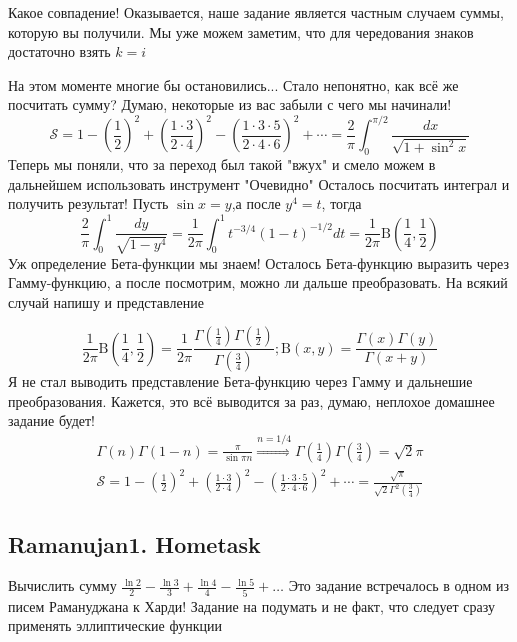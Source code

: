 	Какое совпадение! Оказывается, наше задание является частным случаем суммы, которую вы получили. Мы уже можем заметим, что для чередования знаков достаточно взять $k=i$
	
	На этом моменте многие бы остановились... Стало непонятно, как всё же посчитать сумму? Думаю, некоторые из вас забыли с чего мы начинали!
	$$
	\mathcal{S}=1-\left(\frac{1}{2}\right)^2+\left(\frac{1 \cdot 3}{2 \cdot 4}\right)^2-\left(\frac{1 \cdot 3 \cdot 5}{2 \cdot 4 \cdot 6}\right)^2+\cdots=\frac{2}{\pi} \int_0^{\pi / 2} \frac{d x}{\sqrt{1+\sin ^2 x}}
	$$
	Теперь мы поняли, что за переход был такой "вжух" и смело можем в дальнейшем использовать инструмент "Очевидно" Осталось посчитать интеграл и получить результат!
	Пусть $\sin x=y$,а после $y^4=t$, тогда
	$$
	\frac{2}{\pi} \int_0^1 \frac{d y}{\sqrt{1-y^4}}=\frac{1}{2 \pi} \int_0^1 t^{-3 / 4}(1-t)^{-1 / 2} d t=\frac{1}{2 \pi} \mathrm{B}\left(\frac{1}{4}, \frac{1}{2}\right)
	$$
	Уж определение Бета-функции мы знаем! Осталось Бета-функцию выразить через Гамму-функцию, а после посмотрим, можно ли дальше преобразовать. На всякий случай напишу и представление
	
	$$
	\frac{1}{2 \pi} \mathrm{B}\left(\frac{1}{4}, \frac{1}{2}\right)=\frac{1}{2 \pi} \frac{\Gamma\left(\frac{1}{4}\right) \Gamma\left(\frac{1}{2}\right)}{\Gamma\left(\frac{3}{4}\right)} ; \mathrm{B}(x, y)=\frac{\Gamma(x) \Gamma(y)}{\Gamma(x+y)}
	$$
	Я не стал выводить представление Бета-функцию через Гамму и дальнешие преобразования. Кажется, это всё выводится за раз, думаю, неплохое домашнее задание будет!
	$$
	\begin{gathered}
		\Gamma(n) \Gamma(1-n)=\frac{\pi}{\sin \pi n} \stackrel{n=1 / 4}{\Rightarrow} \Gamma\left(\frac{1}{4}\right) \Gamma\left(\frac{3}{4}\right)=\sqrt{2} \pi \\
		\mathcal{S}=1-\left(\frac{1}{2}\right)^2+\left(\frac{1 \cdot 3}{2 \cdot 4}\right)^2-\left(\frac{1 \cdot 3 \cdot 5}{2 \cdot 4 \cdot 6}\right)^2+\cdots=\frac{\sqrt{\pi}}{\sqrt{2} \Gamma^2\left(\frac{3}{4}\right)}
	\end{gathered}
	$$
	
	\subsection{Ramanujan1. Hometask}
	
	Вычислить сумму $\frac{\ln 2}{2}-\frac{\ln 3}{3}+\frac{\ln 4}{4}-\frac{\ln 5}{5}+\ldots$
	Это задание встречалось в одном из писем Рамануджана к Харди!
	Задание на подумать и не факт, что следует сразу применять эллиптические функции
	

